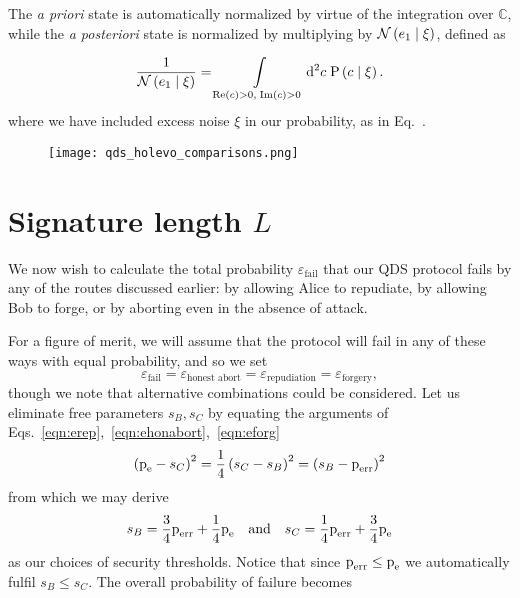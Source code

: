 The \emph{a priori} state is automatically normalized by virtue of the integration over $\mathbb{C}$, while the \emph{a posteriori} state is normalized by multiplying by $\mathcal{N}\left(e_1 \; \middle| \; \xi \right)$, defined as 

\begin{equation}
\frac{1}{\mathcal{N}\left(e_1 \; \middle| \; \xi\right)} = \int\limits_{\text{Re}\left(c\right) > 0, \; \text{Im}\left(c\right)>0} \mathop{}\!\mathrm{d^2} c \; \text{P}\left(c \; \middle| \; \xi \right).
\end{equation}
where we have included excess noise $\xi$ in our probability, as in Eq.~.




\begin{figure}
\texttt{[image: qds\_holevo\_comparisons.png]}
\caption{\label{fig:qds_holevo_comparisons}}
\end{figure}


\section{Signature length $L$}
We now wish to calculate the total probability $\varepsilon_{\text{fail}}$ that our QDS protocol fails by any of the routes discussed earlier: by allowing Alice to repudiate, by allowing Bob to forge, or by aborting even in the absence of attack.

For a figure of merit, we will assume that the protocol will fail in any of these ways with equal probability, and so we set
\begin{equation}
\varepsilon_{\text{fail}} = \varepsilon_{\text{honest abort}} = \varepsilon_{\text{repudiation}} = \varepsilon_{\text{forgery}},
\end{equation}
though we note that alternative combinations could be considered. Let us eliminate free parameters $s_B, s_C$ by equating the arguments of Eqs.~\ref{eqn:erep},~\ref{eqn:ehonabort},~\ref{eqn:eforg}
\begin{equation}
\left(\text{p}_{\text{e}} - s_C\right)^2  = \frac{1}{4}\left(s_C - s_B\right)^2 = \left(s_B - \text{p}_{\text{err}}\right)^2
\end{equation}
from which we may derive
\begin{equation}
s_B = \frac{3}{4} \perr + \frac{1}{4}\pe \qq{and} s_C = \frac{1}{4}\perr + \frac{3}{4}\pe
\end{equation}
as our choices of security thresholds. Notice that since $\text{p}_{\text{err}} \le \text{p}_{\text{e}}$ we automatically fulfil $s_B \le s_C$. The overall probability of failure becomes

